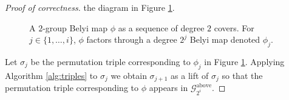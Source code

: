 \documentclass{dcthesis}
\newcommand{\PP}{\mathbb P}
\theoremstyle{definition}
\theoremstyle{remark}
\numberwithin{equation}{section}
\numberwithin{figure}{section}
\begin{document}
{{\begin{proof}[Proof of correctness]
      the diagram in Figure \ref{fig:2groupfiltration}.
      \begin{figure}[ht]
        \begin{center}
        \end{center}
        \caption{
          A $2$-group Belyi map $\phi$
          as a sequence of degree $2$ covers.
          For $j\in\{1,\dots,i\}$,
          $\phi$ factors through
          a degree $2^j$ Belyi map denoted $\phi_j$.
        }
        \label{fig:2groupfiltration}
      \end{figure}
      Let $\sigma_j$ be the permutation triple corresponding to
      $\phi_j$ in Figure \ref{fig:2groupfiltration}.
      Applying Algorithm \ref{alg:triples} to $\sigma_j$
      we obtain $\sigma_{j+1}$ as a lift of $\sigma_j$
      so that the permutation triple corresponding to $\phi$
      appears in $\mathscr{G}_{2^i}^\text{above}$.

\end{proof}}}
\end{document}
